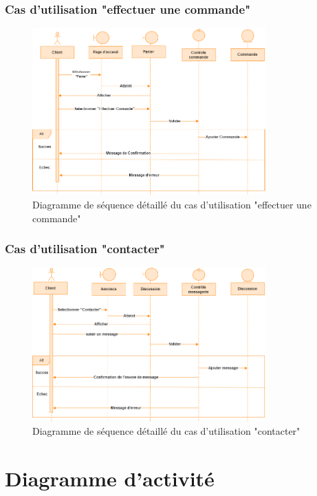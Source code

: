 \documentclass[edit,12pt,a4paper,ChapStyle,oneside,doubleinterligne]{report}
\begin{document}
\subsubsection{Cas d'utilisation "effectuer une commande"}
\begin{figure}[H]\label{fig:Diagramme cas 4d}
\centering
\includegraphics[width=0.8\textwidth]{images/Effectuer une commande d.png}
\caption{Diagramme de séquence détaillé du cas d'utilisation "effectuer une commande"}
\end{figure}


\newpage
\subsubsection{Cas d'utilisation "contacter"}
\begin{figure}[h!]\label{fig:Diagramme cas 5d}
\centering
\includegraphics[width=0.8\textwidth]{images/contacter d.png}
\caption{Diagramme de séquence détaillé du cas d'utilisation "contacter"}
\end{figure}




\section{Diagramme d'activité}
\end{document}
